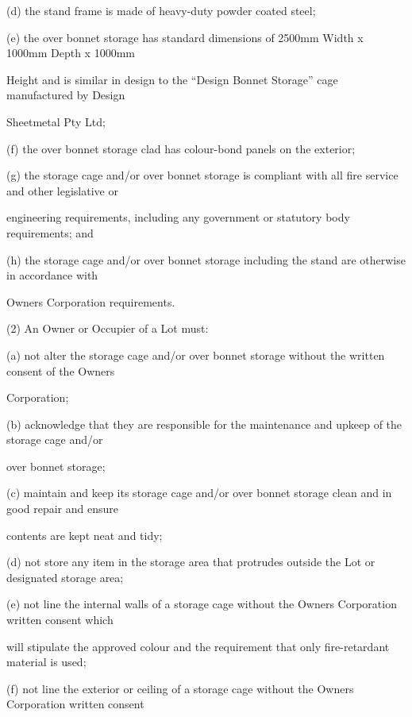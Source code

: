 \documentclass{article}
\begin{document}
{\fontsize{9.962}{1}(d) the stand frame is made of heavy-duty powder coated steel; }

{\fontsize{9.962}{1}(e) the over bonnet storage has standard dimensions of 2500mm Width x 1000mm Depth x 1000mm }

{\fontsize{10.02}{1}Height and is similar in design to the “Design Bonnet Storage” cage manufactured by Design }

{\fontsize{10.02}{1}Sheetmetal Pty Ltd; }

{\fontsize{9.962}{1}(f) the over bonnet storage clad has colour-bond panels on the exterior; }

{\fontsize{9.962}{1}(g) the storage cage and/or over bonnet storage is compliant with all fire service and other legislative or }

{\fontsize{10.02}{1}engineering requirements, including any government or statutory body requirements; and }

{\fontsize{9.962}{1}(h) the storage cage and/or over bonnet storage including the stand are otherwise in accordance with }

{\fontsize{10.02}{1}Owners Corporation requirements. }

{\fontsize{9.962}{1}(2) An Owner or Occupier of a Lot must: }

{\fontsize{9.962}{1}(a) not alter the storage cage and/or over bonnet storage without the written consent of the Owners }

{\fontsize{10.02}{1}Corporation; }

{\fontsize{9.962}{1}(b) acknowledge that they are responsible for the maintenance and upkeep of the storage cage and/or }

{\fontsize{10.02}{1}over bonnet storage; }

{\fontsize{9.962}{1}(c) maintain and keep its storage cage and/or over bonnet storage clean and in good repair and ensure }

{\fontsize{10.02}{1}contents are kept neat and tidy; }

{\fontsize{9.962}{1}(d) not store any item in the storage area that protrudes outside the Lot or designated storage area; }

{\fontsize{9.962}{1}(e) not line the internal walls of a storage cage without the Owners Corporation written consent which }

{\fontsize{10.02}{1}will stipulate the approved colour and the requirement that only fire-retardant material is used; }

{\fontsize{9.962}{1}(f) not line the exterior or ceiling of a storage cage without the Owners Corporation written consent }
\end{document}
